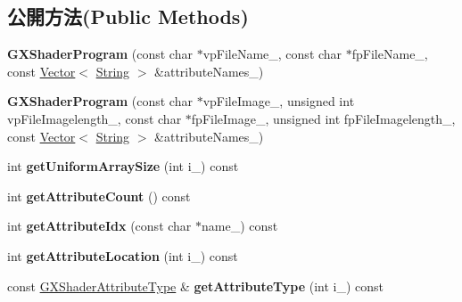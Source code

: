 \subsection*{公開方法(Public Methods)}
\begin{DoxyCompactItemize}
\item 
{\bfseries G\+X\+Shader\+Program} (const char $\ast$vp\+File\+Name\+\_\+, const char $\ast$fp\+File\+Name\+\_\+, const \hyperlink{class_magnum_1_1_vector}{Vector}$<$ \hyperlink{class_magnum_1_1_string}{String} $>$ \&attribute\+Names\+\_\+)\hypertarget{class_magnum_1_1_g_x_shader_program_a67726e0d94a7e540b10aca1f9f8319c2}{}\label{class_magnum_1_1_g_x_shader_program_a67726e0d94a7e540b10aca1f9f8319c2}

\item 
{\bfseries G\+X\+Shader\+Program} (const char $\ast$vp\+File\+Image\+\_\+, unsigned int vp\+File\+Imagelength\+\_\+, const char $\ast$fp\+File\+Image\+\_\+, unsigned int fp\+File\+Imagelength\+\_\+, const \hyperlink{class_magnum_1_1_vector}{Vector}$<$ \hyperlink{class_magnum_1_1_string}{String} $>$ \&attribute\+Names\+\_\+)\hypertarget{class_magnum_1_1_g_x_shader_program_aa676157808779825e737571decc41110}{}\label{class_magnum_1_1_g_x_shader_program_aa676157808779825e737571decc41110}

\item 
int {\bfseries get\+Uniform\+Array\+Size} (int i\+\_\+) const \hypertarget{class_magnum_1_1_g_x_shader_program_a8d21004ff17f6e5685c4ea527dcffe04}{}\label{class_magnum_1_1_g_x_shader_program_a8d21004ff17f6e5685c4ea527dcffe04}

\item 
int {\bfseries get\+Attribute\+Count} () const \hypertarget{class_magnum_1_1_g_x_shader_program_afdae36e0a1cbc7e56cc837309c50ba84}{}\label{class_magnum_1_1_g_x_shader_program_afdae36e0a1cbc7e56cc837309c50ba84}

\item 
int {\bfseries get\+Attribute\+Idx} (const char $\ast$name\+\_\+) const \hypertarget{class_magnum_1_1_g_x_shader_program_ab1b85ed737b8471a2d954212295759f7}{}\label{class_magnum_1_1_g_x_shader_program_ab1b85ed737b8471a2d954212295759f7}

\item 
int {\bfseries get\+Attribute\+Location} (int i\+\_\+) const \hypertarget{class_magnum_1_1_g_x_shader_program_ae9f2d5d93fb75a00ca8849d5c3217176}{}\label{class_magnum_1_1_g_x_shader_program_ae9f2d5d93fb75a00ca8849d5c3217176}

\item 
const \hyperlink{class_magnum_1_1_g_x_shader_attribute_type}{G\+X\+Shader\+Attribute\+Type} \& {\bfseries get\+Attribute\+Type} (int i\+\_\+) const \hypertarget{class_magnum_1_1_g_x_shader_program_af8f26063bfd202b43acab94952febeeb}{}\label{class_magnum_1_1_g_x_shader_program_af8f26063bfd202b43acab94952febeeb}


\end{DoxyCompactItemize}
